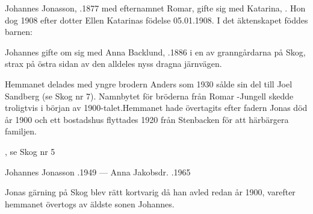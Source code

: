 


Johannes Jonasson, .1877 med efternamnet Romar, gifte sig med Katarina, . Hon dog 1908 efter dotter Ellen Katarinas födelse 05.01.1908. I det äktenskapet föddes barnen:

\begin{jhchildren}
  \item {}
  \item {}
  \item {}
\end{jhchildren}

Johannes gifte om sig med Anna Backlund, .1886 i en av granngårdarna på Skog, strax på östra sidan av den alldeles nyss dragna järnvägen.

Hemmanet delades med yngre brodern Anders som 1930 sålde sin del till Joel Sandberg (se Skog nr 7). Namnbytet för bröderna från Romar -Jungell skedde troligtvis i början av 1900-talet.Hemmanet hade övertagits efter fadern Jonas död år 1900 och ett bostadshus flyttades 1920 från Stenbacken för att härbärgera familjen.

\begin{jhchildren}
  \item {}, se Skog nr 5
  \item {}
  \item {}
  \item {}
\end{jhchildren}

Johannes Jonasson .1949   ---   Anna Jakobsdr. .1965


Jonas gärning på Skog blev rätt kortvarig då han avled redan år 1900, varefter hemmanet övertogs av äldste sonen Johannes.

\begin{jhchildren}
  \item {}
  \item {}
  \item {}
  \item {}
  \item {}
  \item {}
  \item {}
\end{jhchildren}

